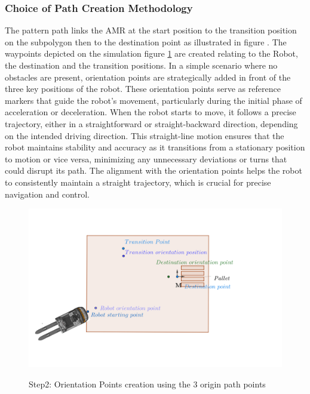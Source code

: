 \subsubsection{Choice of Path Creation Methodology}
The pattern path links the AMR at the start position to the transition position on the subpolygon then to the 
destination point as illustrated in figure . 
The waypoints depicted on the simulation figure \ref{Orientation} 
are created relating to the 
Robot, the destination and the transition positions. In a simple scenario where no obstacles are present, orientation points 
are strategically added in front of the three key positions of the robot. These orientation points serve as reference markers 
that guide the robot's movement, particularly during the initial phase of acceleration or deceleration. When the robot starts 
to move, it follows a precise trajectory, either in a straightforward or straight-backward direction, depending on the 
intended driving direction. This straight-line motion ensures that the robot maintains stability and accuracy as it 
transitions from a stationary position to motion or vice versa, minimizing any unnecessary deviations or turns that could 
disrupt its path. The alignment with the orientation points helps the robot to consistently maintain a straight trajectory, 
which is crucial for precise navigation and control.
\begin{figure}[H]
    \begin{center}
        \includegraphics[width=5in]{images/Chap2/Orientation_points.png}\\
        \caption{Step2: Orientation Points creation using the 3 origin path points}
        \label{Orientation}
        \end{center}    
\end{figure}

